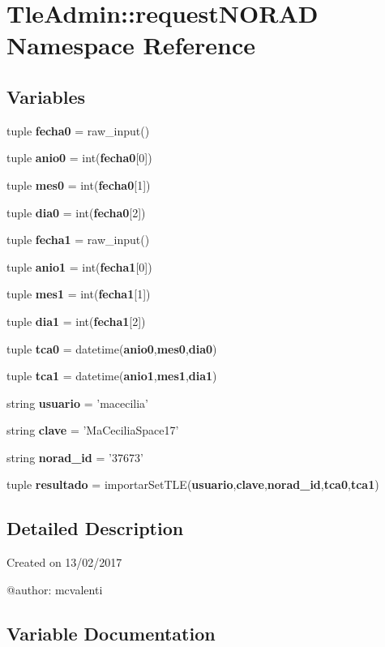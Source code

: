 \section{\-Tle\-Admin\-:\-:request\-N\-O\-R\-A\-D \-Namespace \-Reference}
\label{namespace_tle_admin_1_1request_n_o_r_a_d}
\subsection*{\-Variables}
\begin{DoxyCompactItemize}
\item 
tuple {\bf fecha0} = raw\-\_\-input()
\item 
tuple {\bf anio0} = int({\bf fecha0}[0])
\item 
tuple {\bf mes0} = int({\bf fecha0}[1])
\item 
tuple {\bf dia0} = int({\bf fecha0}[2])
\item 
tuple {\bf fecha1} = raw\-\_\-input()
\item 
tuple {\bf anio1} = int({\bf fecha1}[0])
\item 
tuple {\bf mes1} = int({\bf fecha1}[1])
\item 
tuple {\bf dia1} = int({\bf fecha1}[2])
\item 
tuple {\bf tca0} = datetime({\bf anio0},{\bf mes0},{\bf dia0})
\item 
tuple {\bf tca1} = datetime({\bf anio1},{\bf mes1},{\bf dia1})
\item 
string {\bf usuario} = 'macecilia'
\item 
string {\bf clave} = '\-Ma\-Cecilia\-Space17'
\item 
string {\bf norad\-\_\-id} = '37673'
\item 
tuple {\bf resultado} = importar\-Set\-T\-L\-E({\bf usuario},{\bf clave},{\bf norad\-\_\-id},{\bf tca0},{\bf tca1})
\end{DoxyCompactItemize}


\subsection{\-Detailed \-Description}
\begin{DoxyVerb}
Created on 13/02/2017

@author: mcvalenti
\end{DoxyVerb}
 

\subsection{\-Variable \-Documentation}
